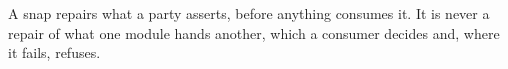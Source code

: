 
A snap repairs what a party asserts, before anything consumes it. It is never
a repair of what one module hands another, which a consumer decides and, where
it fails, refuses.

